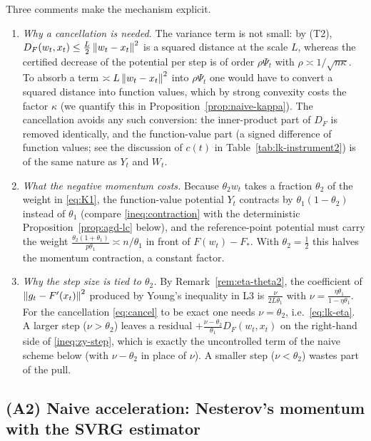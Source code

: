 Three comments make the mechanism explicit.
\begin{enumerate}
\item \emph{Why a cancellation is needed.} The variance term is not small: by (T2), $D_F(w_t,x_t)\le\frac L2\left\|w_t-x_t\right\|^2$ is a squared distance at the scale $L$, whereas the certified decrease of the potential per step is of order $\rho\Psi_t$ with $\rho\asymp1/\sqrt{n\kappa}$. To absorb a term $\asymp L\left\|w_t-x_t\right\|^2$ into $\rho\Psi_t$ one would have to convert a squared distance into function values, which by strong convexity costs the factor $\kappa$ (we quantify this in Proposition~\ref{prop:naive-kappa}). The cancellation avoids any such conversion: the inner-product part of $D_F$ is removed identically, and the function-value part (a signed difference of function values; see the discussion of $c(t)$ in Table~\ref{tab:lk-instrument2}) is of the same nature as $Y_t$ and $W_t$.
\item \emph{What the negative momentum costs.} Because $\theta_2w_t$ takes a fraction $\theta_2$ of the weight in \eqref{eq:K1}, the function-value potential $Y_t$ contracts by $\theta_1(1-\theta_2)$ instead of $\theta_1$ (compare \eqref{ineq:contraction} with the deterministic Proposition~\ref{prop:agd-lc} below), and the reference-point potential must carry the weight $\frac{\theta_2(1+\theta_1)}{p\theta_1}\asymp n/\theta_1$ in front of $F(w_t)-F_\ast$. With $\theta_2=\frac12$ this halves the momentum contraction, a constant factor.
\item \emph{Why the step size is tied to $\theta_2$.} By Remark~\ref{rem:eta-theta2}, the coefficient of $\left\|g_t-F'(x_t)\right\|^2$ produced by Young's inequality in L3 is $\frac{\nu}{2L\theta_1}$ with $\nu=\frac{\eta\theta_1}{1-\eta\theta_1}$. For the cancellation \eqref{eq:cancel} to be exact one needs $\nu=\theta_2$, i.e.\ \eqref{eq:lk-eta}. A larger step ($\nu>\theta_2$) leaves a residual $+\frac{\nu-\theta_2}{\theta_1}D_F(w_t,x_t)$ on the right-hand side of \eqref{ineq:zy-step}, which is exactly the uncontrolled term of the naive scheme below (with $\nu-\theta_2$ in place of $\nu$). A smaller step ($\nu<\theta_2$) wastes part of the pull.
\end{enumerate}

\subsection{(A2) Naive acceleration: Nesterov's momentum with the SVRG estimator}
\label{sec:lk-naive}

